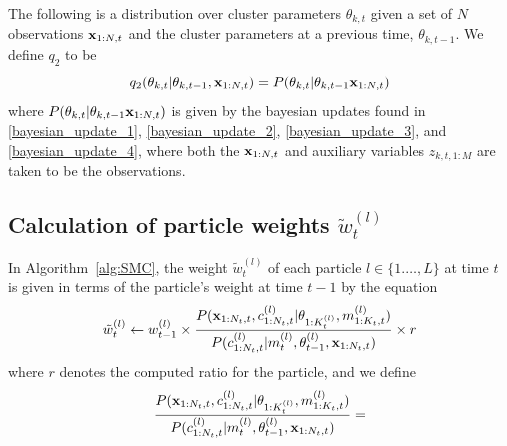 \documentclass[smallcondensed, final]{svjour3}
\begin{document}
The following is a distribution over cluster parameters $\theta_{k,t}$ given a set of $N$ observations $\bold{x}_{1:N, t}$ and the cluster parameters at a previous time, $\theta_{k,t-1}$. We define $q_{2}$ to be
\begin{equation}
\label{smc_q2_eqn}
q_{2}(\theta_{k,t} | \theta_{k,t-1},\bold{x}_{1:N,t}) = P(\theta_{k,t} | \theta_{k,t-1} \bold{x}_{1:N,t})
\end{equation}
where $P(\theta_{k,t} | \theta_{k,t-1} \bold{x}_{1:N,t})$ is given by the bayesian updates found in \eqref{bayesian_update_1}, \eqref{bayesian_update_2}, \eqref{bayesian_update_3}, and \eqref{bayesian_update_4}, where both the $\bold{x}_{1:N,t}$ and auxiliary variables $z_{k,t,1:M}$ are taken to be the observations.




\subsection{Calculation of particle weights $\tilde{w}_{t}^{(l)}$}
In Algorithm~\ref{alg:SMC}, the weight $\tilde{w}_{t}^{(l)}$ of each particle $l \in \{ 1. \ldots, L \}$ at time $t$ is given in terms of the particle's weight at time $t-1$ by the equation
\begin{equation}
\tilde{w}_{t}^{(l)} \leftarrow w_{t-1}^{(l)} \times \frac{ P(\bold{x}_{1:N_{t},t}, c_{1:N_{t}, t}^{(l)} | \theta_{1:K_{t}^{(l)}}, m_{1:K_{t},t}^{(l)})}	{P(c_{1:N_{t}, t}^{(l)} | m_{t}^{(l)}, \theta_{t-1}^{(l)}, \bold{x}_{1:N_{t},t} ) } \times r
\end{equation}
where $r$ denotes the computed ratio for the particle, and we define
\begin{equation}
\label{smc_weight_eqn}
\begin{split}
& \frac{ P(\bold{x}_{1:N_{t},t}, c_{1:N_{t}, t}^{(l)} | \theta_{1:K_{t}^{(l)}}, m_{1:K_{t},t}^{(l)})}	{P(c_{1:N_{t}, t}^{(l)} | m_{t}^{(l)}, \theta_{t-1}^{(l)}, \bold{x}_{1:N_{t},t} ) }  = \\
\end{split}
\end{equation}
\end{document}
